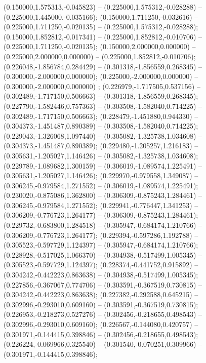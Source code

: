  (0.150000,1.575313,-0.045823) -- (0.225000,1.575312,-0.028288) -- (0.225000,1.445000,-0.035166);
 (0.150000,1.711250,-0.032616) -- (0.225000,1.711250,-0.020135) -- (0.225000,1.575312,-0.028288);
 (0.150000,1.852812,-0.017341) -- (0.225000,1.852812,-0.010706) -- (0.225000,1.711250,-0.020135);
 (0.150000,2.000000,0.000000) -- (0.225000,2.000000,0.000000) -- (0.225000,1.852812,-0.010706);
 (0.226048,-1.856784,0.284429) -- (0.301318,-1.856559,0.268345) -- (0.300000,-2.000000,0.000000);
 (0.225000,-2.000000,0.000000) -- (0.300000,-2.000000,0.000000) ;
 (0.226979,-1.717505,0.537156) -- (0.302489,-1.717150,0.506663) -- (0.301318,-1.856559,0.268345);
 (0.227790,-1.582446,0.757363) -- (0.303508,-1.582040,0.714225) -- (0.302489,-1.717150,0.506663);
 (0.228479,-1.451880,0.944330) -- (0.304373,-1.451487,0.890389) -- (0.303508,-1.582040,0.714225);
 (0.229043,-1.326068,1.097440) -- (0.305082,-1.325738,1.034608) -- (0.304373,-1.451487,0.890389);
 (0.229480,-1.205257,1.216183) -- (0.305631,-1.205027,1.146426) -- (0.305082,-1.325738,1.034608);
 (0.229789,-1.089682,1.300159) -- (0.306019,-1.089574,1.225491) -- (0.305631,-1.205027,1.146426);
 (0.229970,-0.979558,1.349087) -- (0.306245,-0.979584,1.271552) -- (0.306019,-1.089574,1.225491);
 (0.230020,-0.875086,1.362800) -- (0.306309,-0.875243,1.284461) -- (0.306245,-0.979584,1.271552);
 (0.229941,-0.776447,1.341253) -- (0.306209,-0.776723,1.264177) -- (0.306309,-0.875243,1.284461);
 (0.229732,-0.683800,1.284518) -- (0.305947,-0.684174,1.210766) -- (0.306209,-0.776723,1.264177);
 (0.229394,-0.597286,1.192788) -- (0.305523,-0.597729,1.124397) -- (0.305947,-0.684174,1.210766);
 (0.228928,-0.517025,1.066370) -- (0.304938,-0.517499,1.005345) -- (0.305523,-0.597729,1.124397);
 (0.228374,-0.441752,0.915892) -- (0.304242,-0.442223,0.863638) -- (0.304938,-0.517499,1.005345);
 (0.227856,-0.367067,0.774706) -- (0.303591,-0.367519,0.730815) -- (0.304242,-0.442223,0.863638);
 (0.227382,-0.292588,0.645215) -- (0.302996,-0.293010,0.609160) -- (0.303591,-0.367519,0.730815);
 (0.226953,-0.218273,0.527276) -- (0.302456,-0.218655,0.498543) -- (0.302996,-0.293010,0.609160);
 (0.226567,-0.144080,0.420757) -- (0.301971,-0.144415,0.398846) -- (0.302456,-0.218655,0.498543);
 (0.226224,-0.069966,0.325540) -- (0.301540,-0.070251,0.309966) -- (0.301971,-0.144415,0.398846);
